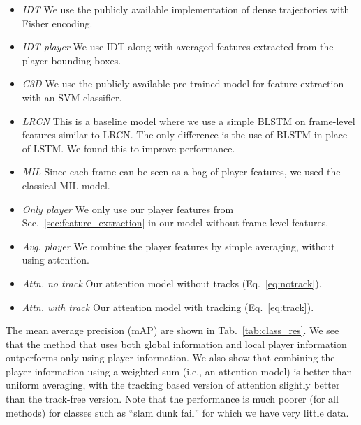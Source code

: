 \begin{itemize}
  \item \emph{IDT\cite{Wang_CVPR11}} We use the publicly available implementation of dense trajectories with
  Fisher encoding.
  
  \item \emph{IDT\cite{Wang_CVPR11} player} We use IDT along with averaged features extracted from the player
  bounding boxes.

  \item \emph{C3D \cite{Tran_arxiv14}} We use the publicly available pre-trained model for feature extraction
  with an SVM classifier.

  \item \emph{LRCN \cite{Donahue_arxiv14}} This is a baseline model where we use a simple BLSTM on frame-level features similar
  to LRCN. The only difference is the use of BLSTM in place of LSTM. We found this to improve
  performance.

  \item \emph{MIL \cite{Andrews_NIPS02}} Since each frame can be seen as a bag of player features, we used the
  classical MIL model. 

\item \emph{Only player} We only use our player features from Sec.~\ref{sec:feature_extraction} in our model
  without frame-level features.
 
  \item \emph{Avg. player} We combine the player features by simple averaging, without
using  attention.

  \item \emph{Attn. no track} Our attention model without tracks (Eq.~\ref{eq:notrack}).

  \item \emph{Attn. with track} Our attention model with tracking (Eq.~\ref{eq:track}).
\end{itemize}

The mean average precision (mAP)
are shown in Tab.~\ref{tab:class_res}. We see that the method that
uses both global information and local player information outperforms
only using player information. We also show that combining the player
information using a weighted sum (i.e., an attention model) is better
than uniform averaging, with the tracking based version of attention
slightly better than the track-free version.
Note that the performance is much poorer (for all methods) for classes
such as ``slam dunk fail'' for which we have very little data.


